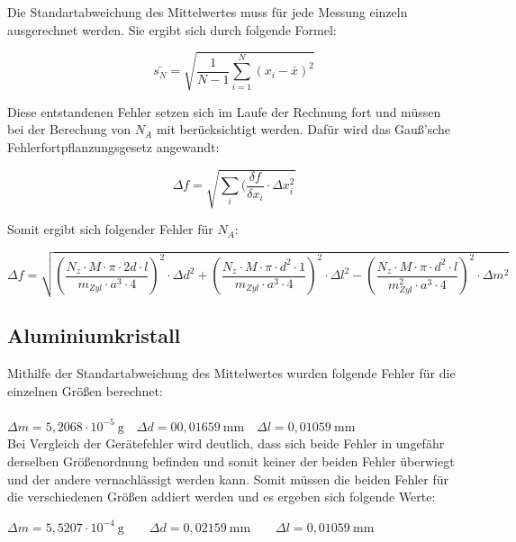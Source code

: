 \documentclass[12pt,a4paper,titlepage,headinclude,bibtotoc]{scrartcl}
\begin{document}
Die Standartabweichung des Mittelwertes muss für jede Messung einzeln ausgerechnet werden. Sie ergibt sich durch folgende Formel:

\begin{equation}
\bar{s_N}=\sqrt{\frac{1}{N-1}\sum_{i=1}^N (x_i -\bar{x})^2}
\end{equation}

Diese entstandenen Fehler setzen sich im Laufe der Rechnung fort und müssen bei der Berechung von $N_A$ mit berücksichtigt werden. Dafür wird das Gauß'sche Fehlerfortpflanzungsgesetz angewandt:

\begin{equation}
\Delta f =\sqrt{\sum_{i}(\frac{\delta f}{\delta x_i}\cdot\Delta x^2_i}
\end{equation}

Somit ergibt sich folgender Fehler für $N_A$:

\begin{equation}
\Delta f = \sqrt{\left(\frac{N_z \cdot M \cdot \pi \cdot 2d \cdot l}{m_{Zyl} \cdot a^3 \cdot 4}\right)^2 \cdot \Delta d^2 + \left(\frac{N_z \cdot M \cdot \pi \cdot d^2 \cdot 1}{m_{Zyl} \cdot a^3 \cdot 4}\right)^2 \cdot \Delta l^2 - \left(\frac{N_z \cdot M \cdot \pi \cdot d^2 \cdot l}{m_{Zyl}^2 \cdot a^3 \cdot 4}\right)^2 \cdot \Delta m^2}
\end{equation}

\subsection{Aluminiumkristall}
 
Mithilfe der Standartabweichung des Mittelwertes wurden folgende Fehler für die einzelnen Größen berechnet:
\\
\\
$\Delta m = 5,2068\cdot10^{-5} \ \mathrm{g} \quad \Delta d= 00,01659 \ \mathrm{mm} \quad \Delta l = 0,01059\ \mathrm{mm}$\\

\vspace{3mm}
Bei Vergleich der Gerätefehler wird deutlich, dass sich beide Fehler in ungefähr derselben Größenordnung befinden und somit keiner der beiden Fehler überwiegt und der andere vernachlässigt werden kann. Somit müssen die beiden Fehler für die verschiedenen Größen addiert werden und es ergeben sich folgende Werte:

\vspace{3mm} 
$\Delta m =5,5207\cdot 10^{-4}\ \mathrm{g} \qquad\Delta d =0,02159\ \mathrm{mm}\qquad \Delta l = 0,01059\ \mathrm{mm}$
\vspace{3mm}
 
\end{document}

